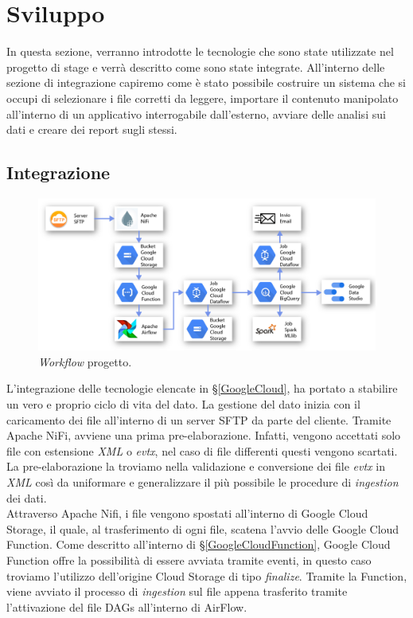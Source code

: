 \chapter{Sviluppo}\label{ch:sviluppo}
In questa sezione, verranno introdotte le tecnologie che sono state utilizzate nel progetto di stage e verrà descritto come sono state integrate. All'interno delle sezione di integrazione capiremo come è stato possibile costruire un sistema che si occupi di selezionare i file corretti da leggere, importare il contenuto manipolato all'interno di un applicativo interrogabile dall'esterno, avviare delle analisi sui dati e creare dei report sugli stessi.
\section{Integrazione}
\begin{figure}[h!]
	\centering
	\includegraphics[scale=0.65]{figures/Schema_complessivo_ridotto}
	\caption[Workflow progetto	.]{\emph{Workflow} progetto.
		\label{fig:workflow}}
\end{figure}	
L'integrazione delle tecnologie elencate in §\ref{GoogleCloud}{}, ha portato a stabilire un vero e proprio ciclo di vita del dato.
La gestione del dato inizia con il caricamento dei file all'interno di un server SFTP da parte del cliente. Tramite Apache NiFi, avviene una prima pre-elaborazione. Infatti, vengono accettati solo file con estensione \emph{XML} o \emph{evtx}, nel caso di file differenti questi vengono scartati. La pre-elaborazione la troviamo nella validazione e conversione dei file \emph{evtx} in \emph{XML} così da uniformare e generalizzare il più possibile le procedure di \emph{ingestion} dei dati.
\\
Attraverso Apache Nifi, i file vengono spostati all'interno di Google Cloud Storage, il quale, al trasferimento di ogni file, scatena l'avvio delle Google Cloud Function. Come descritto all'interno di §\ref{GoogleCloudFunction}{}, Google Cloud Function offre la possibilità di essere avviata tramite eventi, in questo caso troviamo l'utilizzo dell'origine Cloud Storage di tipo \emph{finalize}. Tramite la Function, viene avviato il processo di \emph{ingestion} sul file appena trasferito tramite l'attivazione del file DAGs all'interno di AirFlow.
